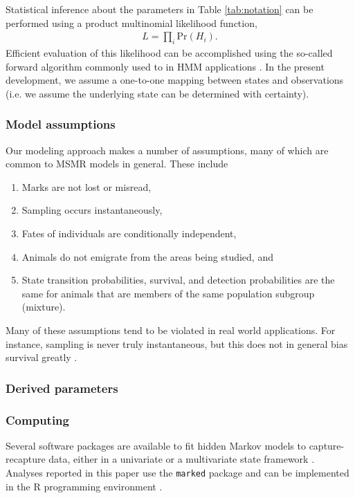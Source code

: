 \documentclass[times,mee,doublespace,]{besauth2}
\begin{document}
Statistical inference about the parameters in Table \ref{tab:notation} can be performed using a product multinomial likelihood function, 
\begin{eqnarray*}
  L = \prod_i \textrm{Pr}(H_i).
\end{eqnarray*}
Efficient evaluation of this likelihood can be accomplished using the so-called forward algorithm commonly used to in HMM applications \citep{ZucchiniMacDonald2009,Laake2013}.  In the present development, we assume a one-to-one mapping between states and observations (i.e. we assume the underlying state can be determined with certainty).

\subsubsection{Model assumptions}

Our modeling approach makes a number of assumptions, many of which are common to MSMR models in general.  These include
\begin{enumerate}
  \item Marks are not lost or misread,
  \item Sampling occurs instantaneously,
  \item Fates of individuals are conditionally independent,
  \item Animals do not emigrate from the areas being studied, and
  \item State transition probabilities, survival, and detection probabilities are the same for animals that are members of the same population subgroup (mixture).
\end{enumerate}
Many of these assumptions tend to be violated in real world applications.  For instance, sampling is never truly instantaneous, but this does not in general bias survival greatly \citep{OBrienEtAl2005}.  

\subsubsection{Derived parameters}

\subsubsection{Computing}

Several software packages are available to fit hidden Markov models to capture-recapture data, either in a univariate \citep[e.g. E-SURGE[]{ChoquetEtAl2009b)} or a multivariate state framework \citep[\texttt{marked}][]{LaakeEtAl2013,JohnsonEtAl2016}.  Analyses reported in this paper use the \texttt{marked} package and can be implemented in the R programming environment \citep{RTeam2015}.
\end{document}
